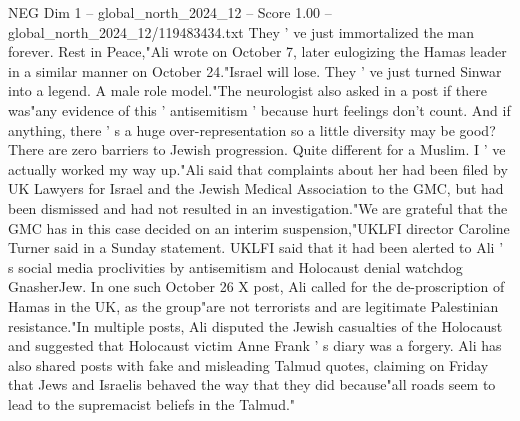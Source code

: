 \begin{textsample}{NEG Dim 1 – global\_north\_2024\_12 – Score 1.00 – global\_north\_2024\_12/119483434.txt}
They ' ve just immortalized the man forever.
Rest in Peace,"Ali wrote on October 7, later eulogizing the Hamas leader in a similar manner on October 24."Israel will lose.
They ' ve just turned Sinwar into a legend.
A male role model."The neurologist also asked in a post if there was"any evidence of this ' antisemitism ' because hurt feelings don't count.
And if anything, there ' s a huge over-representation so a little diversity may be good?
There are zero barriers to Jewish progression.
Quite different for a Muslim.
I ' ve actually worked my way up."Ali said that complaints about her had been filed by UK Lawyers for Israel and the Jewish Medical Association to the GMC, but had been dismissed and had not resulted in an investigation."We are grateful that the GMC has in this case decided on an interim suspension,"UKLFI director Caroline Turner said in a Sunday statement.
UKLFI said that it had been alerted to Ali ' s social media proclivities by antisemitism and Holocaust denial watchdog GnasherJew.
In one such October 26 X post, Ali called for the de-proscription of Hamas in the UK, as the group"are not terrorists and are legitimate Palestinian resistance."In multiple posts, Ali disputed the Jewish casualties of the Holocaust and suggested that Holocaust victim Anne Frank ' s diary was a forgery.
Ali has also shared posts with fake and misleading Talmud quotes, claiming on Friday that Jews and Israelis behaved the way that they did because"all roads seem to lead to the supremacist beliefs in the Talmud."

\end{textsample}
